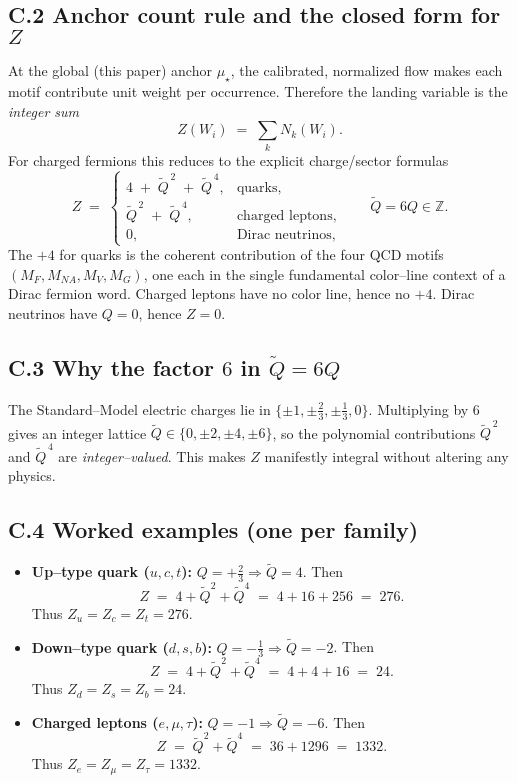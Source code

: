\documentclass[epjc3]{svjour3}
\begin{document}
\subsection*{C.2 Anchor count rule and the closed form for $Z$}
At the global (this paper) anchor $\mu_\star$, the calibrated, normalized flow makes each motif contribute unit weight per occurrence. Therefore the landing variable is the \emph{integer sum}
\[
  Z(W_i)\;=\;\sum_k N_k(W_i).
\]
For charged fermions this reduces to the explicit charge/sector formulas
\[
  Z \;=\;
  \begin{cases}
    4\;+\;\tilde Q^{\,2}\;+\;\tilde Q^{\,4}, & \text{quarks},\\[4pt]
    \tilde Q^{\,2}\;+\;\tilde Q^{\,4}, & \text{charged leptons},\\[4pt]
    0, & \text{Dirac neutrinos},
  \end{cases}
  \qquad \tilde Q=6Q\in\mathbb{Z}.
\]
The \textbf{$+4$} for quarks is the coherent contribution of the four QCD motifs $(M_F,M_{NA},M_V,M_G)$, one each in the single fundamental color–line context of a Dirac fermion word. Charged leptons have no color line, hence no $+4$. Dirac neutrinos have $Q=0$, hence $Z=0$.

\subsection*{C.3 Why the factor $6$ in $\tilde Q=6Q$}
The Standard–Model electric charges lie in $\{\pm1,\pm\tfrac{2}{3},\pm\tfrac{1}{3},0\}$. Multiplying by $6$ gives an integer lattice $\tilde Q\in\{0,\pm2,\pm4,\pm6\}$, so the polynomial contributions $\tilde Q^{\,2}$ and $\tilde Q^{\,4}$ are \emph{integer–valued}. This makes $Z$ manifestly integral without altering any physics.

\subsection*{C.4 Worked examples (one per family)}
\begin{itemize}
  \item \textbf{Up–type quark ($u,c,t$):} $Q=+\tfrac{2}{3}\Rightarrow \tilde Q=4$.
        Then
        \[
           Z \;=\; 4 + \tilde Q^{2} + \tilde Q^{4}
             \;=\; 4 + 16 + 256 \;=\; 276.
        \]
        Thus $Z_u=Z_c=Z_t=276$.
  \item \textbf{Down–type quark ($d,s,b$):} $Q=-\tfrac{1}{3}\Rightarrow \tilde Q=-2$.
        Then
        \[
           Z \;=\; 4 + \tilde Q^{2} + \tilde Q^{4}
             \;=\; 4 + 4 + 16 \;=\; 24.
        \]
        Thus $Z_d=Z_s=Z_b=24$.
  \item \textbf{Charged leptons ($e,\mu,\tau$):} $Q=-1\Rightarrow \tilde Q=-6$.
        Then
        \[
           Z \;=\; \tilde Q^{2} + \tilde Q^{4}
             \;=\; 36 + 1296 \;=\; 1332.
        \]
        Thus $Z_e=Z_\mu=Z_\tau=1332$.
\end{itemize}
\end{document}
